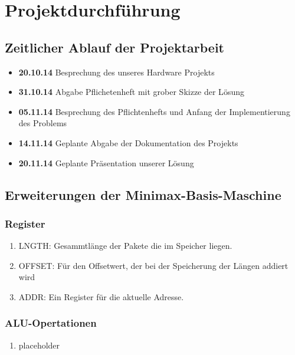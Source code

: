 \documentclass[12pt,titlepage]{article}
\begin{document}
\section{Projektdurchf{\"u}hrung}

\subsection{Zeitlicher Ablauf der Projektarbeit}

\begin{itemize}
\item [] \textbf{20.10.14} Besprechung des unseres Hardware Projekts
\item [] \textbf{31.10.14} Abgabe Pflichetenheft mit grober Skizze der L{\"o}sung
\item [] \textbf{05.11.14} Besprechung des Pflichtenhefts und Anfang der Implementierung des Problems
\item [] \textbf{14.11.14} Geplante Abgabe der Dokumentation des Projekts
\item [] \textbf{20.11.14} Geplante Pr{\"a}sentation unserer Lösung
\end{itemize}

\subsection{Erweiterungen der Minimax-Basis-Maschine}

\subsubsection{Register}

\begin{enumerate}
\item LNGTH: Gesammtl{\"a}nge der Pakete die im Speicher liegen.
\item OFFSET: F{\"u}r den Offsetwert, der bei der Speicherung der Längen addiert wird
\item ADDR: Ein Register f{\"u}r die aktuelle Adresse.
\end{enumerate}

\subsubsection{ALU-Opertationen}

\begin{enumerate}
\item placeholder
\end{enumerate}
\end{document}
